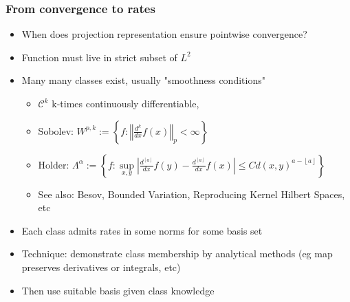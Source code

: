 \documentclass[bigger]{beamer}
\begin{document}
\begin{frame}

\frametitle{From convergence to rates}


\begin{itemize}

\item When does projection representation ensure pointwise convergence?
\item Function must live in strict subset of $L^2$
\item Many many classes exist, usually "smoothness conditions"
\begin{itemize}
\item $\mathcal{C}^k$ k-times continuously differentiable, 
\item Sobolev: $W^{p,k}:=\left\{f:\left\Vert \frac{d^k}{dx}f(x)\right\Vert_p<\infty\right\}$
\item Holder: $\Lambda^\alpha:=\left\{f:\underset{x,y}{\sup}|\frac{d^{\left\lfloor a\right\rfloor}}{dx}f(y)-\frac{d^{\left\lfloor a\right\rfloor}}{dx}f(x)|\leq Cd(x,y)^{a-\left\lfloor a\right\rfloor}\right\}$
\item See also: Besov, Bounded Variation, Reproducing Kernel Hilbert Spaces, etc
\end{itemize} 
\item Each class admits rates in some norms for some basis set
\item Technique: demonstrate class membership by analytical methods (eg map preserves derivatives or integrals, etc)
\item Then use suitable basis given class knowledge
\end{itemize}


\end{frame}%
\end{document}
